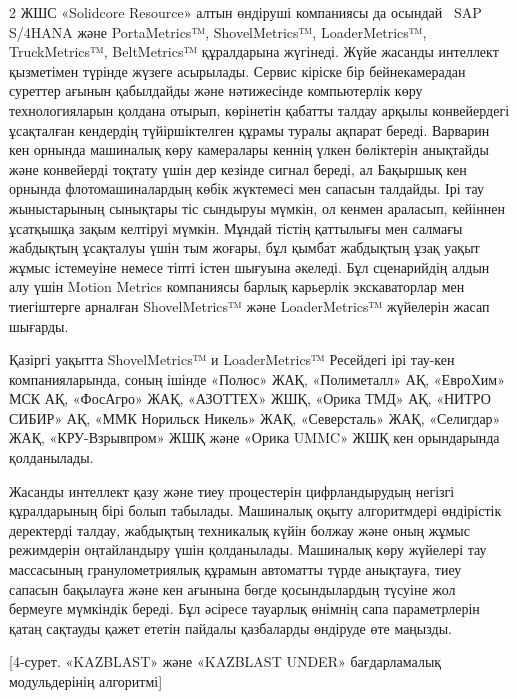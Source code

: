 \begin{multicols}{2}
ЖШС «Solidcore Resource» алтын өндіруші компаниясы да осындай ~SAP
S/4HANA және PortaMetrics™, ShovelMetrics™, LoaderMetrics™,
TruckMetrics™, BeltMetrics™ құралдарына жүгінеді. Жүйе жасанды интеллект
қызметімен түрінде жүзеге асырылады. Сервис кіріске бір бейнекамерадан
суреттер ағынын қабылдайды және нәтижесінде компьютерлік көру
технологияларын қолдана отырып, көрінетін қабатты талдау арқылы
конвейердегі ұсақталған кендердің түйіршіктелген құрамы туралы ақпарат
береді. Варварин кен орнында машиналық көру камералары кеннің үлкен
бөліктерін анықтайды және конвейерді тоқтату үшін дер кезінде сигнал
береді, ал Бақыршық кен орнында флотомашиналардың көбік жүктемесі мен
сапасын талдайды. Ірі тау жыныстарының сынықтары тіс сындыруы мүмкін, ол
кенмен араласып, кейіннен ұсатқышқа зақым келтіруі мүмкін. Мұндай тістің
қаттылығы мен салмағы жабдықтың ұсақталуы үшін тым жоғары, бұл қымбат
жабдықтың ұзақ уақыт жұмыс істемеуіне немесе тіпті істен шығуына
әкеледі. Бұл сценарийдің алдын алу үшін Motion Metrics компаниясы барлық
карьерлік экскаваторлар мен тиегіштерге арналған ShovelMetrics™ және
LoaderMetrics™ жүйелерін жасап шығарды.

Қазіргі уақытта ShovelMetrics™ и LoaderMet\-rics™ Ресейдегі ірі тау-кен
компанияларында, соның ішінде «Полюс» ЖАҚ, «Полиметалл» АҚ, «ЕвроХим»
МСК АҚ, «ФосАгро» ЖАҚ, «АЗОТТЕХ» ЖШҚ, «Орика ТМД» АҚ, «НИТРО СИБИР» АҚ,
«ММК Норильск Никель» ЖАҚ, «Северсталь» ЖАҚ, «Селигдар» ЖАҚ,
«КРУ-Взрывпром» ЖШҚ және «Орика UMMC» ЖШҚ кен орындарында қолданылады.

Жасанды интеллект қазу және тиеу процестерін цифрландырудың негізгі
құралдарының бірі болып табылады. Машиналық оқыту алгоритмдері
өндірістік деректерді талдау, жабдықтың техникалық күйін болжау және
оның жұмыс режимдерін оңтайландыру үшін қолданылады. Машиналық көру
жүйелері тау массасының гранулометриялық құрамын автоматты түрде
анықтауға, тиеу сапасын бақылауға және кен ағынына бөгде қосындылардың
түсуіне жол бермеуге мүмкіндік береді. Бұл әсіресе тауарлық өнімнің сапа
параметрлерін қатаң сақтауды қажет ететін пайдалы қазбаларды өндіруде
өте маңызды.
\end{multicols}

[4-сурет. «KAZBLAST» және «KAZBLAST UNDER»
бағдарламалық модульдерінің алгоритмі]

